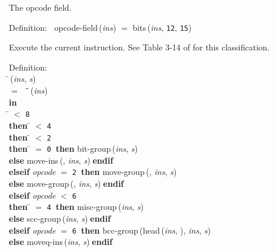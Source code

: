  The opcode field.
\begin{tabbing}{\sc Definition}:$\;\;$
{\rm{opcode-field}}\,({\it{ins\/}}) $=$ {\rm{bits}}\,({\it{ins\/}}, {\tt{12}}, {\tt{15}})
\end{tabbing}

 Execute the current instruction.  See Table 3-14 of \cite{m20}
 for this classification.
\begin{tabbing}{\sc Definition}: \\  
\=\,({\it{ins\/}}, {\it{s\/}}) \\ 
$=$$\;\;\;\;$\=\=\,({\it{ins\/}})\- \\ 
{\bf in} \\ 
\= $<$ {\tt{8}} \\ 
{\bf then }\= $<$ {\tt{4}} \\ 
{\bf then }\= $<$ {\tt{2}} \\ 
{\bf then }\= $=$ {\tt{0}}$\;\;${\bf then }{\rm{bit-group}}\,({\it{ins\/}}, {\it{s\/}}) \\ 
{\bf else }{\rm{move-ins}}\,({}, {\it{ins\/}}, {\it{s\/}})$\;${\bf  endif}\- \\ 
{\bf elseif }{\it{opcode\/}} $=$ {\tt{2}}$\;\;${\bf then }{\rm{move-group}}\,({}, {\it{ins\/}}, {\it{s\/}}) \\ 
{\bf else }{\rm{move-group}}\,({}, {\it{ins\/}}, {\it{s\/}})$\;${\bf  endif}\- \\ 
{\bf elseif }{\it{opcode\/}} $<$ {\tt{6}} \\ 
{\bf then }\= $=$ {\tt{4}}$\;\;${\bf then }{\rm{misc-group}}\,({\it{ins\/}}, {\it{s\/}}) \\ 
{\bf else }{\rm{scc-group}}\,({\it{ins\/}}, {\it{s\/}})$\;${\bf  endif}\- \\ 
{\bf elseif }{\it{opcode\/}} $=$ {\tt{6}}$\;\;${\bf then }{\rm{bcc-group}}\,({\rm{head}}\,({\it{ins\/}}, {}), {\it{ins\/}}, {\it{s\/}}) \\ 
{\bf else }{\rm{moveq-ins}}\,({\it{ins\/}}, {\it{s\/}})$\;${\bf  endif}\- \\ 
$$
\end{tabbing}
